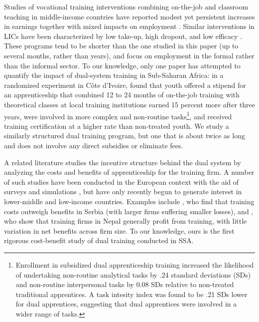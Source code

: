 \documentclass[
  a4paper, twoside, 12pt]{book}
\begin{document}
Studies of vocational training interventions combining on-the-job and classroom teaching in middle-income countries have reported modest yet persistent increases in earnings together with mixed impacts on employment \autocite{card2011,attanasio2011,ibarraran2014,alzua2016,attanasio2017,ibarraran2019}. Similar interventions in LICs have been characterized by low take-up, high dropout, and low efficacy \autocites[see][]{blattman2015,ghisletta2021}[ for an overview]{tripney2013}. These programs tend to be shorter than the one studied in this paper (up to several months, rather than years), and focus on employment in the formal rather than the informal sector. To our knowledge, only one paper has attempted to quantify the impact of dual-system training in Sub-Saharan Africa: in a randomized experiment in Côte d'Ivoire, \textcite{crepon2019} found that youth offered a stipend for an apprenticeship that combined 12 to 24 months of on-the-job training with theoretical classes at local training institutions earned 15 percent more after three years, were involved in more complex and non-routine tasks\footnote{Enrollment in subsidized dual apprenticeship training increased the likelihood of undertaking non-routine analytical tasks by .24 standard deviations (SDs) and non-routine interpersonal tasks by 0.08 SDs relative to non-treated traditional apprentices. A task intesity index was found to be .21 SDs lower for dual apprentices, suggesting that dual apprentices were involved in a wider range of tasks.}, and received training certification at a higher rate than non-treated youth. We study a similarly structured dual training program, but one that is about twice as long and does not involve any direct subsidies or eliminate fees.

A related literature studies the incentive structure behind the dual system by analyzing the costs and benefits of apprenticeship for the training firm. A number of such studies have been conducted in the European context with the aid of surveys and simulations \autocites[see, e.g.,][]{muhlemann2016,muhlemann2019,muhlemann2014}, but have only recently begun to generate interest in lower-middle and low-income countries. Examples include \textcite{bolli2021}, who find that training costs outweigh benefits in Serbia (with larger firms suffering smaller losses), and \textcite{bolli2020}, who show that training firms in Nepal generally profit from training, with little variation in net benefits across firm size. To our knowledge, ours is the first rigorous cost-benefit study of dual training conducted in SSA.
\end{document}
